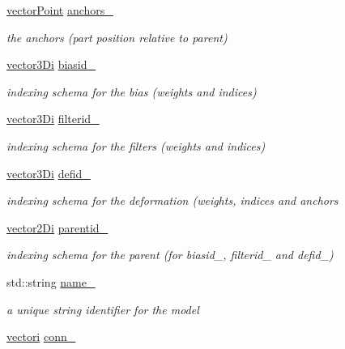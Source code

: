 \begin{DoxyCompactItemize}
\hyperlink{types_8hpp_ac468fcf6870d6563ac8fa3669845afcc}{vector\-Point} \hyperlink{class_model_ac2aa3eb0450ac05d0a3c7274b4ad91eb}{anchors\-\_\-}
\begin{DoxyCompactList}\small\item\em the anchors (part position relative to parent) \end{DoxyCompactList}\item 
\hyperlink{types_8hpp_a1f7c8ad00a53fb2d61b3656da9a6581d}{vector3\-Di} \hyperlink{class_model_a7c3905dd5e45a2e60da02c783a49db9c}{biasid\-\_\-}
\begin{DoxyCompactList}\small\item\em indexing schema for the bias (weights and indices) \end{DoxyCompactList}\item 
\hyperlink{types_8hpp_a1f7c8ad00a53fb2d61b3656da9a6581d}{vector3\-Di} \hyperlink{class_model_a08e65111230ab010535cc9485dfd6d0d}{filterid\-\_\-}
\begin{DoxyCompactList}\small\item\em indexing schema for the filters (weights and indices) \end{DoxyCompactList}\item 
\hyperlink{types_8hpp_a1f7c8ad00a53fb2d61b3656da9a6581d}{vector3\-Di} \hyperlink{class_model_a381f13c9035313ffd1cb67e07a2e84bd}{defid\-\_\-}
\begin{DoxyCompactList}\small\item\em indexing schema for the deformation (weights, indices and anchors \end{DoxyCompactList}\item 
\hyperlink{types_8hpp_a93a5e2cfd40d1ff1f10d8bbf11884c41}{vector2\-Di} \hyperlink{class_model_a4e1151fe7911f52ec75944eff1b257f4}{parentid\-\_\-}
\begin{DoxyCompactList}\small\item\em indexing schema for the parent (for biasid\-\_\-, filterid\-\_\- and defid\-\_\-) \end{DoxyCompactList}\item 
std\-::string \hyperlink{class_model_afca3bde5ad33e936c455d3d311b8406d}{name\-\_\-}
\begin{DoxyCompactList}\small\item\em a unique string identifier for the model \end{DoxyCompactList}\item 
\hyperlink{types_8hpp_a44529587d60e73bf0e689a82e5e70a55}{vectori} \hyperlink{class_model_a976b10b7048b41203eae19c141654abf}{conn\-\_\-}

\end{DoxyCompactItemize}
